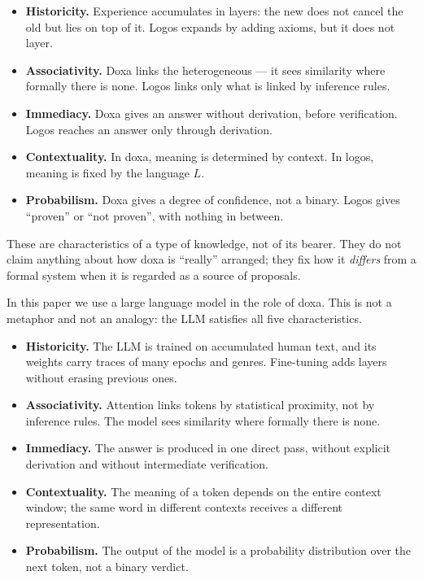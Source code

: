 \documentclass[12pt,a4paper]{article}
\begin{document}
\begin{itemize}
	\item \textbf{Historicity.} Experience accumulates in layers: the new does
	      not cancel the old but lies on top of it. Logos expands by adding
	      axioms, but it does not layer.
	\item \textbf{Associativity.} Doxa links the heterogeneous --- it sees
	      similarity where formally there is none. Logos links only what is
	      linked by inference rules.
	\item \textbf{Immediacy.} Doxa gives an answer without derivation, before
	      verification. Logos reaches an answer only through derivation.
	\item \textbf{Contextuality.} In doxa, meaning is determined by context.
	      In logos, meaning is fixed by the language $L$.
	\item \textbf{Probabilism.} Doxa gives a degree of confidence, not a
	      binary. Logos gives ``proven'' or ``not proven'', with nothing in
	      between.
\end{itemize}

These are characteristics of a type of knowledge, not of its bearer. They do
not claim anything about how doxa is ``really'' arranged; they fix how it
\emph{differs} from a formal system when it is regarded as a source of
proposals.

In this paper we use a large language model in the role of doxa. This is not a
metaphor and not an analogy: the LLM satisfies all five characteristics.

\begin{itemize}
	\item \textbf{Historicity.} The LLM is trained on accumulated human text,
	      and its weights carry traces of many epochs and genres. Fine-tuning
	      adds layers without erasing previous ones.
	\item \textbf{Associativity.} Attention links tokens by statistical
	      proximity, not by inference rules. The model sees similarity where
	      formally there is none.
	\item \textbf{Immediacy.} The answer is produced in one direct pass,
	      without explicit derivation and without intermediate verification.
	\item \textbf{Contextuality.} The meaning of a token depends on the
	      entire context window; the same word in different contexts receives
	      a different representation.
	\item \textbf{Probabilism.} The output of the model is a probability
	      distribution over the next token, not a binary verdict.
\end{itemize}
\end{document}
